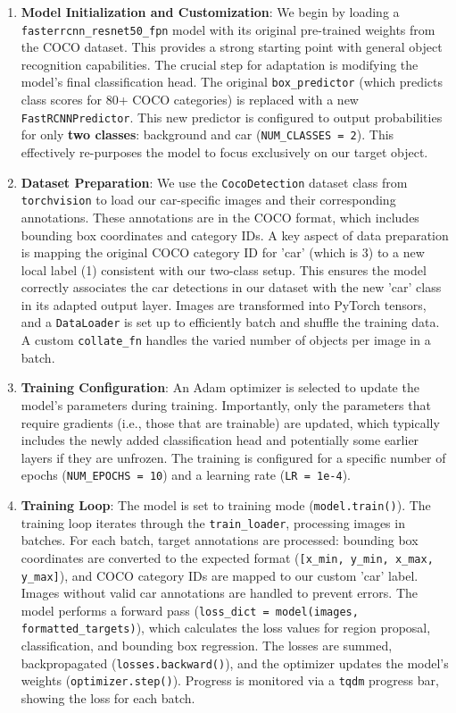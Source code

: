 \documentclass[12pt,a4paper]{article}
\begin{document}
\begin{enumerate}
    \item \textbf{Model Initialization and Customization}:
    We begin by loading a \texttt{fasterrcnn\_resnet50\_fpn} model with its original pre-trained weights from the COCO dataset. This provides a strong starting point with general object recognition capabilities. The crucial step for adaptation is modifying the model's final classification head. The original \texttt{box\_predictor} (which predicts class scores for 80+ COCO categories) is replaced with a new \texttt{FastRCNNPredictor}. This new predictor is configured to output probabilities for only \textbf{two classes}: background and car (\texttt{NUM\_CLASSES = 2}). This effectively re-purposes the model to focus exclusively on our target object.

    \item \textbf{Dataset Preparation}:
    We use the \texttt{CocoDetection} dataset class from \texttt{torchvision} to load our car-specific images and their corresponding annotations. These annotations are in the COCO format, which includes bounding box coordinates and category IDs. A key aspect of data preparation is mapping the original COCO category ID for 'car' (which is 3) to a new local label (1) consistent with our two-class setup. This ensures the model correctly associates the car detections in our dataset with the new 'car' class in its adapted output layer. Images are transformed into PyTorch tensors, and a \texttt{DataLoader} is set up to efficiently batch and shuffle the training data. A custom \texttt{collate\_fn} handles the varied number of objects per image in a batch.

    \item \textbf{Training Configuration}:
    An Adam optimizer is selected to update the model's parameters during training. Importantly, only the parameters that require gradients (i.e., those that are trainable) are updated, which typically includes the newly added classification head and potentially some earlier layers if they are unfrozen. The training is configured for a specific number of epochs (\texttt{NUM\_EPOCHS = 10}) and a learning rate (\texttt{LR = 1e-4}).

    \item \textbf{Training Loop}:
    The model is set to training mode (\texttt{model.train()}). The training loop iterates through the \texttt{train\_loader}, processing images in batches. For each batch, target annotations are processed: bounding box coordinates are converted to the expected format (\texttt{[x\_min, y\_min, x\_max, y\_max]}), and COCO category IDs are mapped to our custom 'car' label. Images without valid car annotations are handled to prevent errors. The model performs a forward pass (\texttt{loss\_dict = model(images, formatted\_targets)}), which calculates the loss values for region proposal, classification, and bounding box regression. The losses are summed, backpropagated (\texttt{losses.backward()}), and the optimizer updates the model's weights (\texttt{optimizer.step()}). Progress is monitored via a \texttt{tqdm} progress bar, showing the loss for each batch.
\end{enumerate}
\end{document}
